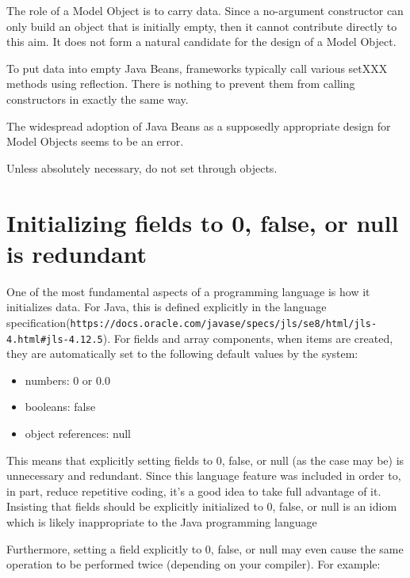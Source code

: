 The role of a Model Object is to carry data. Since a no-argument constructor can only build an object that is initially empty, then it cannot contribute directly to this aim. It does not form a natural candidate for the design of a Model Object.

To put data into empty Java Beans, frameworks typically call various setXXX methods using reflection. There is nothing to prevent them from calling constructors in exactly the same way.

The widespread adoption of Java Beans as a supposedly appropriate design for Model Objects seems to be an error.

\begin{marker}
    Unless absolutely necessary, do not set through objects.
\end{marker}

\section{Initializing fields to 0, false, or null is redundant}

One of the most fundamental aspects of a programming language is how it initializes data. For Java, this is defined explicitly in the language specification(\lstinline{https://docs.oracle.com/javase/specs/jls/se8/html/jls-4.html#jls-4.12.5}). For fields and array components, when items are created, they are automatically set to the following default values by the system:

\begin{itemize}
    \item numbers: 0 or 0.0
    \item booleans: false
    \item object references: null
\end{itemize}

This means that explicitly setting fields to 0, false, or null (as the case may be) is unnecessary and redundant. Since this language feature was included in order to, in part, reduce repetitive coding, it's a good idea to take full advantage of it. Insisting that fields should be explicitly initialized to 0, false, or null is an idiom which is likely inappropriate to the Java programming language

Furthermore, setting a field explicitly to 0, false, or null may even cause the same operation to be performed twice (depending on your compiler). For example:

